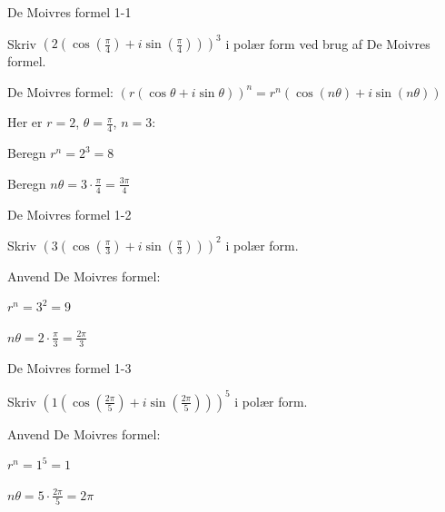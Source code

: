 \documentclass{article}
\begin{document}

\tableofcontents
\newpage

\begin{exercise}{De Moivres formel 1-1}

Skriv $(2(\cos(\frac{\pi}{4}) + i\sin(\frac{\pi}{4})))^3$ i polær form ved brug af De Moivres formel.


\hint

De Moivres formel: $(r(\cos \theta + i \sin \theta))^n = r^n(\cos(n\theta) + i\sin(n\theta))$

\hint

Her er $r = 2$, $\theta = \frac{\pi}{4}$, $n = 3$:

\hint

Beregn $r^n = 2^3 = 8$

\hint

Beregn $n\theta = 3\cdot\frac{\pi}{4} = \frac{3\pi}{4}$

\end{exercise}

\newpage

\begin{exercise}{De Moivres formel 1-2}

Skriv $(3(\cos(\frac{\pi}{3}) + i\sin(\frac{\pi}{3})))^2$ i polær form.


\hint

Anvend De Moivres formel:

\hint

$r^n = 3^2 = 9$

\hint

$n\theta = 2\cdot\frac{\pi}{3} = \frac{2\pi}{3}$

\end{exercise}

\newpage

\begin{exercise}{De Moivres formel 1-3}

Skriv $(1(\cos(\frac{2\pi}{5}) + i\sin(\frac{2\pi}{5})))^5$ i polær form.


\hint

Anvend De Moivres formel:

\hint

$r^n = 1^5 = 1$

\hint

$n\theta = 5\cdot\frac{2\pi}{5} = 2\pi$

\end{exercise}
\end{document}

